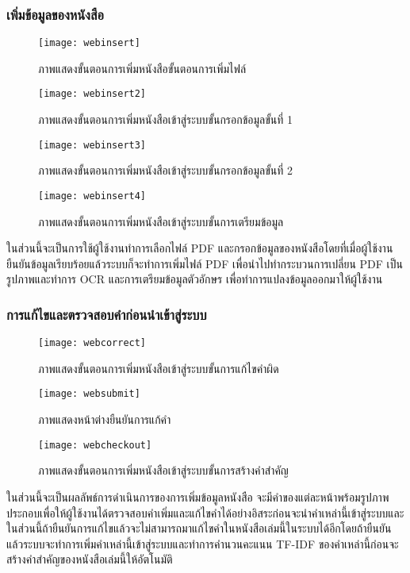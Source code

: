\subsubsection{เพิ่มข้อมูลของหนังสือ}
\begin{figure}[H]
    \centering
    \texttt{[image: webinsert]}
    \caption{ภาพแสดงขั้นตอนการเพิ่มหนังสือขั้นตอนการเพิ่มไฟล์}\label{fig:webinsert}
\end{figure}
\begin{figure}[H]
    \centering
    \texttt{[image: webinsert2]}
    \caption{ภาพแสดงขั้นตอนการเพิ่มหนังสือเข้าสู่ระบบขั้นกรอกข้อมูลขั้นที่ 1}\label{fig:webinsert2}
\end{figure}
\begin{figure}[H]
    \centering
    \texttt{[image: webinsert3]}
    \caption{ภาพแสดงขั้นตอนการเพิ่มหนังสือเข้าสู่ระบบขั้นกรอกข้อมูลขั้นที่ 2}\label{fig:webinsert3}
\end{figure}

\begin{figure}[H]
    \centering
    \texttt{[image: webinsert4]}
    \caption{ภาพแสดงขั้นตอนการเพิ่มหนังสือเข้าสู่ระบบขั้นการเตรียมข้อมูล}\label{fig:webdel}
\end{figure}
ในส่วนนี้จะเป็นการใช้ผู้ใช้งานทำการเลือกไฟล์ PDF และกรอกข้อมูลของหนังสือโดยที่เมื่อผู้ใช้งานยืนยันข้อมูลเรียบร้อยแล้วระบบก็จะทำการเพิ่มไฟล์ PDF เพื่อนำไปทำกระบวนการเปลี่ยน PDF เป็นรูปภาพและทำการ OCR และการเตรียมข้อมูลตัวอักษร  เพื่อทำการแปลงข้อมูลออกมาให้ผู้ใช้งาน

\subsubsection{การแก้ไขและตรวจสอบคำก่อนนำเข้าสู่ระบบ}
\begin{figure}[H]
    \centering
    \texttt{[image: webcorrect]}
    \caption{ภาพแสดงขั้นตอนการเพิ่มหนังสือเข้าสู่ระบบขั้นการแก้ไขคำผิด}\label{fig:webcorrect}
\end{figure}

\begin{figure}[H]
    \centering
    \texttt{[image: websubmit]}
    \caption{ภาพแสดงหน้าต่างยืนยันการแก้คำ}\label{fig:websubmit}
\end{figure}

\begin{figure}[H]
    \centering
    \texttt{[image: webcheckout]}
    \caption{ภาพแสดงขั้นตอนการเพิ่มหนังสือเข้าสู่ระบบขั้นการสร้างคำสำคัญ}\label{fig:webcheckout}
\end{figure}
ในส่วนนี้จะเป็นผลลัพธ์การดำเนินการของการเพิ่มข้อมูลหนังสือ จะมีคำของแต่ละหน้าพร้อมรูปภาพประกอบเพื่อให้ผู้ใช้งานได้ตรวจสอบคำเพิ่มและแก้ไขคำได้อย่างอิสระก่อนจะนำคำเหล่านี้เข้าสู่ระบบและในส่วนนี้ถ้ายืนยันการแก้ไขแล้วจะไม่สามารถมาแก้ไขคำในหนังสือเล่มนี้ในระบบได้อีกโดยถ้ายืนยันแล้วระบบจะทำการเพิ่มคำเหล่านี้เข้าสู่ระบบและทำการคำนวนคะแนน TF-IDF ของคำเหล่านี้ก่อนจะสร้างคำสำคัญของหนังสือเล่มนี้ให้อัตโนมัติ

